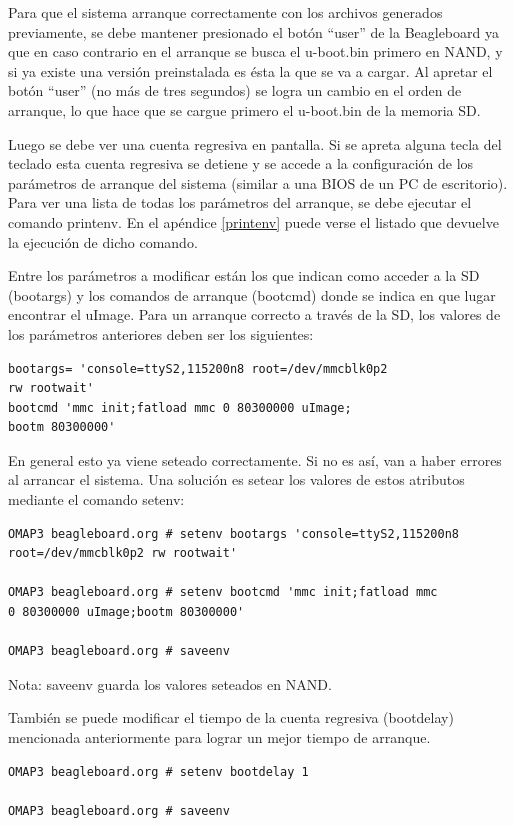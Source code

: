 Para que el sistema arranque correctamente con los archivos generados previamente, se debe mantener presionado el botón “user” de la Beagleboard ya que en caso contrario en el arranque se busca el u-boot.bin primero en NAND, y si ya existe una versión preinstalada es ésta la que se va a cargar. Al apretar el botón “user” (no más de tres segundos) se logra un cambio en el orden de arranque, lo que hace que se cargue primero el u-boot.bin de la memoria SD.

Luego se debe ver una cuenta regresiva en pantalla. 
Si se apreta alguna tecla del teclado esta cuenta regresiva se detiene y se accede a la configuración de los parámetros de arranque del sistema (similar a una BIOS de un PC de escritorio). Para ver una lista de todas los parámetros del arranque, se debe ejecutar el comando printenv. En el apéndice \ref{printenv} puede verse el listado que devuelve la ejecución de dicho comando.

\bigskip
Entre los parámetros a modificar están los que indican como acceder a la SD (bootargs) y los comandos de arranque (bootcmd) donde se indica en que lugar encontrar el uImage. Para un arranque correcto a través de la SD, los valores de los parámetros anteriores deben ser los siguientes:

\begin{verbatim}
bootargs= 'console=ttyS2,115200n8 root=/dev/mmcblk0p2 
rw rootwait' 
bootcmd 'mmc init;fatload mmc 0 80300000 uImage;
bootm 80300000' 
\end{verbatim}

En general esto ya viene seteado correctamente. Si no es así, van a haber errores al arrancar el sistema. Una solución es setear los valores de estos atributos mediante el comando setenv:

\begin{verbatim}
OMAP3 beagleboard.org # setenv bootargs 'console=ttyS2,115200n8 
root=/dev/mmcblk0p2 rw rootwait' 

OMAP3 beagleboard.org # setenv bootcmd 'mmc init;fatload mmc 
0 80300000 uImage;bootm 80300000' 

OMAP3 beagleboard.org # saveenv 
\end{verbatim}

Nota: saveenv guarda los valores seteados en NAND.

\bigskip
También se puede modificar el tiempo de la cuenta regresiva (bootdelay) mencionada anteriormente para lograr un mejor tiempo de arranque.

\begin{verbatim}
OMAP3 beagleboard.org # setenv bootdelay 1

OMAP3 beagleboard.org # saveenv 
\end{verbatim}

